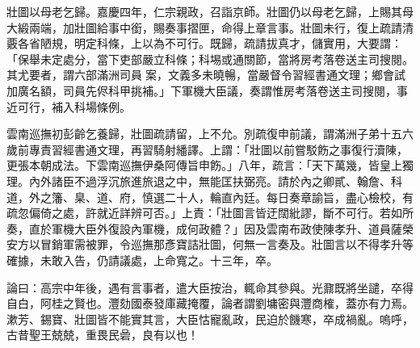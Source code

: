 \begin{pinyinscope}
壯圖以母老乞歸。嘉慶四年，仁宗親政，召詣京師。壯圖仍以母老乞歸，上賜其母大緞兩端，加壯圖給事中銜，賜奏事摺匣，命得上章言事。壯圖未行，復上疏請清覈各省陋規，明定科條，上以為不可行。既歸，疏請拔真才，儲實用，大要謂：「保舉未定處分，當下吏部嚴立科條；科埸或通關節，當將房考落卷送主司搜閱。其尤要者，謂六部滿洲司員案，文義多未曉暢，當嚴督令習經書通文理；鄉會試加廣名額，司員先侭科甲挑補。」下軍機大臣議，奏謂惟房考落卷送主司搜閱，事近可行，補入科場條例。

雲南巡撫初彭齡乞養歸，壯圖疏請留，上不允。別疏復申前議，謂滿洲子弟十五六歲前專責習經書通文理，再習騎射繙譯。上謂：「壯圖以前嘗駁飭之事復行瀆陳，更張本朝成法。下雲南巡撫伊桑阿傳旨申飭。」八年，疏言：「天下萬幾，皆皇上獨理。內外諸臣不過浮沉旅進旅退之中，無能匡扶弼亮。請於內之卿貳、翰詹、科道，外之籓、臬、道、府，慎選二十人，輪直內廷。每日奏章諭旨，盡心檢校，有疏忽偏倚之處，許就近詳辨可否。」上責：「壯圖言皆迂闊紕謬，斷不可行。若如所奏，直於軍機大臣外復設內軍機，成何政體？」因及雲南布政使陳孝升、道員薩榮安方以冒銷軍需被罪，令巡撫那彥寶詰壯圖，何無一言奏及。壯圖言以不得孝升等確據，未敢入告，仍請議處，上命寬之。十三年，卒。

論曰：高宗中年後，遇有言事者，遣大臣按治，輒命其參與。光鼐既將坐譴，卒得自白，阿桂之賢也。灃劾國泰發庫藏掩覆，論者謂劉墉密與灃商榷，蓋亦有力焉。漱芳、錫寶、壯圖皆不能實其言，大臣怙寵亂政，民迫於饑寒，卒成禍亂。嗚呼，古昔聖王兢兢，重畏民碞，良有以也！


\end{pinyinscope}